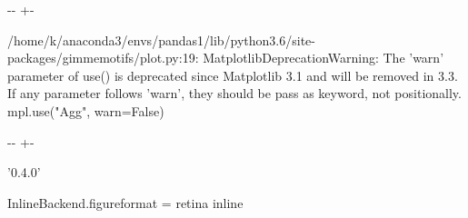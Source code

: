 \documentclass[letterpaper,10pt,english]{sphinxmanual}
\newlength\nbsphinxcodecellspacing
\begin{document}
{

\kern-\sphinxverbatimsmallskipamount\kern-\baselineskip
\kern+\FrameHeightAdjust\kern-\fboxrule
\vspace{\nbsphinxcodecellspacing}

\begin{sphinxVerbatim}[commandchars=\\\{\}]
/home/k/anaconda3/envs/pandas1/lib/python3.6/site-packages/gimmemotifs/plot.py:19: MatplotlibDeprecationWarning: The 'warn' parameter of use() is deprecated since Matplotlib 3.1 and will be removed in 3.3.  If any parameter follows 'warn', they should be pass as keyword, not positionally.
  mpl.use("Agg", warn=False)
\end{sphinxVerbatim}
}

{

\kern-\sphinxverbatimsmallskipamount\kern-\baselineskip
\kern+\FrameHeightAdjust\kern-\fboxrule
\vspace{\nbsphinxcodecellspacing}

\begin{sphinxVerbatim}[commandchars=\\\{\}]
\llap{\color{nbsphinxout}[2]:\,\hspace{\fboxrule}\hspace{\fboxsep}}'0.4.0'
\end{sphinxVerbatim}
}

{
\begin{sphinxVerbatim}[commandchars=\\\{\}]
\llap{\color{nbsphinxin}[3]:\,\hspace{\fboxrule}\hspace{\fboxsep}}
 InlineBackend.figure\PYGZus{}format = \PYGZsq{}retina\PYGZsq{}
 inline

\PYG{p}{[}\PYG{p}{]}  \PYG{p}{[} \PYG{p}{]}
\PYG{p}{[}\PYG{p}{]}  

\end{sphinxVerbatim}
}
\end{document}
